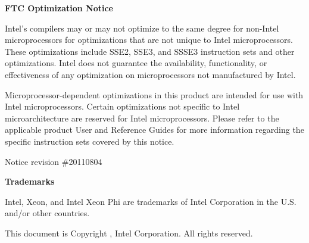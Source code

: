 \documentclass{book}
\begin{document}
\hypersetup{pageanchor=false,citecolor=blue}

{\bf FTC Optimization Notice}

Intel's compilers may or may not optimize to the same degree for non-Intel microprocessors for
optimizations that are not unique to Intel microprocessors. These optimizations include SSE2,
SSE3, and SSSE3 instruction sets and other optimizations. Intel does not guarantee the
availability, functionality, or effectiveness of any optimization on microprocessors not
manufactured by Intel.

Microprocessor-dependent optimizations in this product are intended for use with Intel
microprocessors. Certain optimizations not specific to Intel microarchitecture are reserved for
Intel microprocessors. Please refer to the applicable product User and Reference Guides for
more information regarding the specific instruction sets covered by this notice.

Notice revision \#20110804

\vspace*{0.5cm}

{\bf Trademarks}

Intel, Xeon, and Intel Xeon Phi are trademarks of Intel Corporation in the U.S. and/or other countries.

This document is Copyright , Intel Corporation. All rights reserved. 

\tableofcontents
{}
\hypersetup{pageanchor=true,citecolor=blue}
\end{document}
